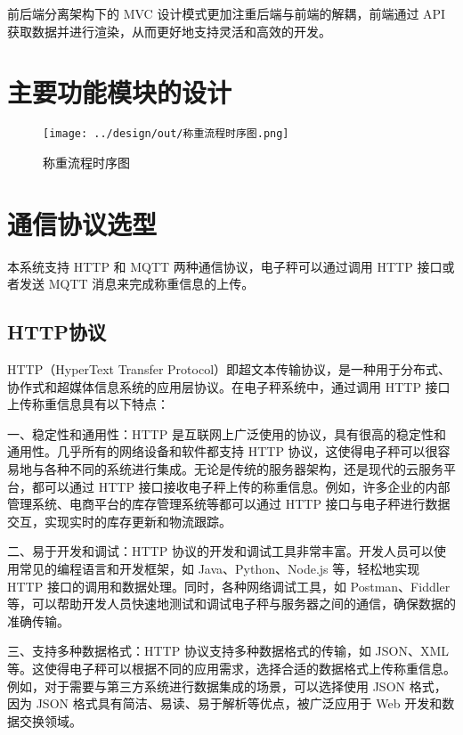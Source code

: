 \documentclass{xduugthesis}
\begin{document}
前后端分离架构下的 MVC 设计模式更加注重后端与前端的解耦，前端通过 API 获取数据并进行渲染，从而更好地支持灵活和高效的开发。

\section{主要功能模块的设计}

\begin{figure}[htb]
    \centering
    \texttt{[image: ../design/out/称重流程时序图.png]}
    \caption{称重流程时序图}
    \label{fig:称重流程时序图}
\end{figure}

\section{通信协议选型}

本系统支持 HTTP 和 MQTT 两种通信协议，电子秤可以通过调用 HTTP 接口或者发送 MQTT 消息来完成称重信息的上传。

\subsection{HTTP协议}

HTTP（HyperText Transfer Protocol）即超文本传输协议，是一种用于分布式、协作式和超媒体信息系统的应用层协议。在电子秤系统中，通过调用 HTTP 接口上传称重信息具有以下特点：

一、稳定性和通用性：HTTP 是互联网上广泛使用的协议，具有很高的稳定性和通用性。几乎所有的网络设备和软件都支持 HTTP 协议，这使得电子秤可以很容易地与各种不同的系统进行集成。无论是传统的服务器架构，还是现代的云服务平台，都可以通过 HTTP 接口接收电子秤上传的称重信息。例如，许多企业的内部管理系统、电商平台的库存管理系统等都可以通过 HTTP 接口与电子秤进行数据交互，实现实时的库存更新和物流跟踪\cite{Zhao2016}。

二、易于开发和调试：HTTP 协议的开发和调试工具非常丰富。开发人员可以使用常见的编程语言和开发框架，如 Java、Python、Node.js 等，轻松地实现 HTTP 接口的调用和数据处理。同时，各种网络调试工具，如 Postman、Fiddler 等，可以帮助开发人员快速地测试和调试电子秤与服务器之间的通信，确保数据的准确传输。

三、支持多种数据格式：HTTP 协议支持多种数据格式的传输，如 JSON、XML 等。这使得电子秤可以根据不同的应用需求，选择合适的数据格式上传称重信息。例如，对于需要与第三方系统进行数据集成的场景，可以选择使用 JSON 格式，因为 JSON 格式具有简洁、易读、易于解析等优点，被广泛应用于 Web 开发和数据交换领域。
\end{document}
